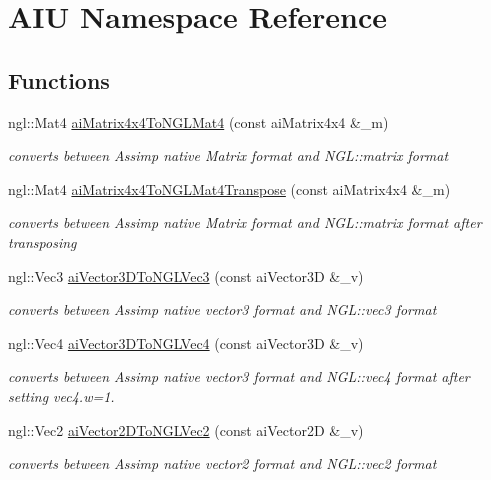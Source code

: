 \hypertarget{namespace_a_i_u}{\section{A\-I\-U Namespace Reference}
\label{namespace_a_i_u}
}
\subsection*{Functions}
\begin{DoxyCompactItemize}
\item 
ngl\-::\-Mat4 \hyperlink{namespace_a_i_u_a51999c877e7faf195cbfaec3bb9cd531}{ai\-Matrix4x4\-To\-N\-G\-L\-Mat4} (const ai\-Matrix4x4 \&\-\_\-m)
\begin{DoxyCompactList}\small\item\em converts between Assimp native Matrix format and N\-G\-L\-::matrix format \end{DoxyCompactList}\item 
ngl\-::\-Mat4 \hyperlink{namespace_a_i_u_a1fd4d6d55704da45f1d762008982f407}{ai\-Matrix4x4\-To\-N\-G\-L\-Mat4\-Transpose} (const ai\-Matrix4x4 \&\-\_\-m)
\begin{DoxyCompactList}\small\item\em converts between Assimp native Matrix format and N\-G\-L\-::matrix format after transposing \end{DoxyCompactList}\item 
ngl\-::\-Vec3 \hyperlink{namespace_a_i_u_ae13de0c4e6897fdf16156c0fdb3430de}{ai\-Vector3\-D\-To\-N\-G\-L\-Vec3} (const ai\-Vector3\-D \&\-\_\-v)
\begin{DoxyCompactList}\small\item\em converts between Assimp native vector3 format and N\-G\-L\-::vec3 format \end{DoxyCompactList}\item 
ngl\-::\-Vec4 \hyperlink{namespace_a_i_u_a830ee88a9d40bc36b063696ef388992b}{ai\-Vector3\-D\-To\-N\-G\-L\-Vec4} (const ai\-Vector3\-D \&\-\_\-v)
\begin{DoxyCompactList}\small\item\em converts between Assimp native vector3 format and N\-G\-L\-::vec4 format after setting vec4.\-w=1. \end{DoxyCompactList}\item 
ngl\-::\-Vec2 \hyperlink{namespace_a_i_u_a62170c913a724cbf821ab2d0edbae052}{ai\-Vector2\-D\-To\-N\-G\-L\-Vec2} (const ai\-Vector2\-D \&\-\_\-v)
\begin{DoxyCompactList}\small\item\em converts between Assimp native vector2 format and N\-G\-L\-::vec2 format \end{DoxyCompactList}\item 

\end{DoxyCompactItemize}
